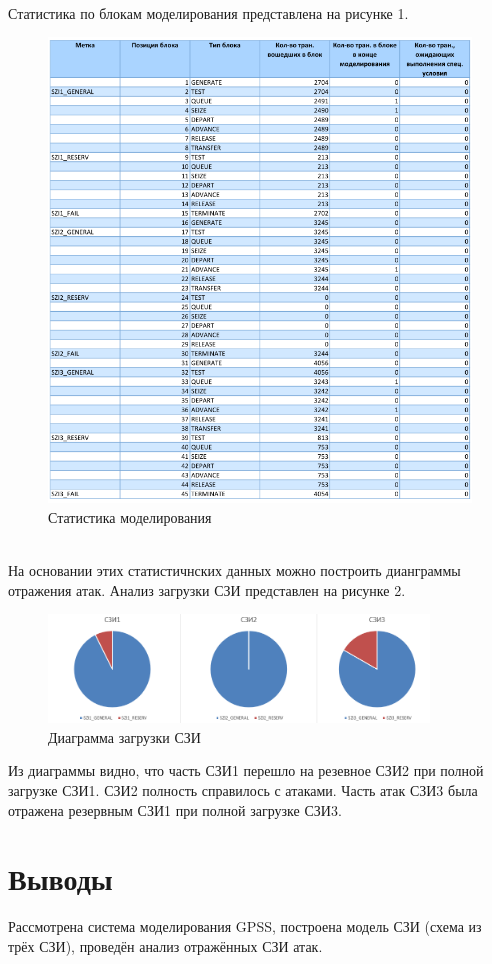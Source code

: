 ~\\

Статистика по блокам моделирования представлена на рисунке 1.

\begin{figure}[ht!]
    \centering
    \includegraphics[width=\textwidth]{inc/blocks}
    \caption{Статистика моделирования}
\end{figure}

~\\

На основании этих статистичнских данных можно построить дианграммы отражения атак. Анализ загрузки СЗИ представлен на рисунке 2.

\begin{figure}[ht!]
    \centering
    \includegraphics[width=0.9\textwidth]{inc/diag}
    \caption{Диаграмма загрузки СЗИ}
\end{figure}

Из диаграммы видно, что часть СЗИ1 перешло на резевное СЗИ2 при полной загрузке СЗИ1. СЗИ2 полность справилось с атаками. Часть атак СЗИ3 была отражена резервным СЗИ1 при полной загрузке СЗИ3.

\section{Выводы}

Рассмотрена система моделирования GPSS, построена модель СЗИ (схема из трёх СЗИ), проведён анализ отражённых СЗИ атак. 
